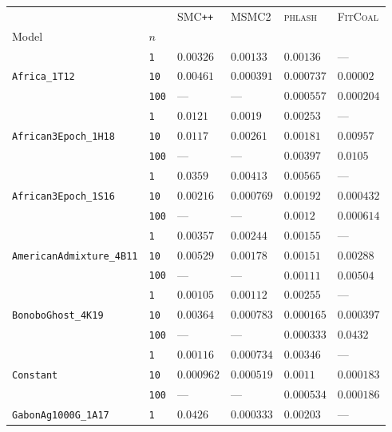 \documentclass{article}
\begin{document}
\begin{footnotesize}
\begin{tabular}{llllll}
\toprule
 &  & \textsc{SMC}\texttt{{++}} & \textsc{MSMC2} & \textsc{phlash} & \textsc{FitCoal} \\
Model & $n$ &  &  &  &  \\
\midrule
\multirow[c]{3}{*}{\texttt{Africa\_1T12}} & \texttt{1} & $0.00326$ & $0.00133$ & $0.00136$ & --- \\
 & \texttt{10} & $0.00461$ & $0.000391$ & $0.000737$ & $0.00002$ \\
 & \texttt{100} & --- & --- & $0.000557$ & $0.000204$ \\
\cline{1-6}
\multirow[c]{3}{*}{\texttt{African3Epoch\_1H18}} & \texttt{1} & $0.0121$ & $0.0019$ & $0.00253$ & --- \\
 & \texttt{10} & $0.0117$ & $0.00261$ & $0.00181$ & $0.00957$ \\
 & \texttt{100} & --- & --- & $0.00397$ & $0.0105$ \\
\cline{1-6}
\multirow[c]{3}{*}{\texttt{African3Epoch\_1S16}} & \texttt{1} & $0.0359$ & $0.00413$ & $0.00565$ & --- \\
 & \texttt{10} & $0.00216$ & $0.000769$ & $0.00192$ & $0.000432$ \\
 & \texttt{100} & --- & --- & $0.0012$ & $0.000614$ \\
\cline{1-6}
\multirow[c]{3}{*}{\texttt{AmericanAdmixture\_4B11}} & \texttt{1} & $0.00357$ & $0.00244$ & $0.00155$ & --- \\
 & \texttt{10} & $0.00529$ & $0.00178$ & $0.00151$ & $0.00288$ \\
 & \texttt{100} & --- & --- & $0.00111$ & $0.00504$ \\
\cline{1-6}
\multirow[c]{3}{*}{\texttt{BonoboGhost\_4K19}} & \texttt{1} & $0.00105$ & $0.00112$ & $0.00255$ & --- \\
 & \texttt{10} & $0.00364$ & $0.000783$ & $0.000165$ & $0.000397$ \\
 & \texttt{100} & --- & --- & $0.000333$ & $0.0432$ \\
\cline{1-6}
\multirow[c]{3}{*}{\texttt{Constant}} & \texttt{1} & $0.00116$ & $0.000734$ & $0.00346$ & --- \\
 & \texttt{10} & $0.000962$ & $0.000519$ & $0.0011$ & $0.000183$ \\
 & \texttt{100} & --- & --- & $0.000534$ & $0.000186$ \\
\cline{1-6}
\multirow[c]{3}{*}{\texttt{GabonAg1000G\_1A17}} & \texttt{1} & $0.0426$ & $0.000333$ & $0.00203$ & --- \\

\end{tabular}
\end{footnotesize}
\end{document}
